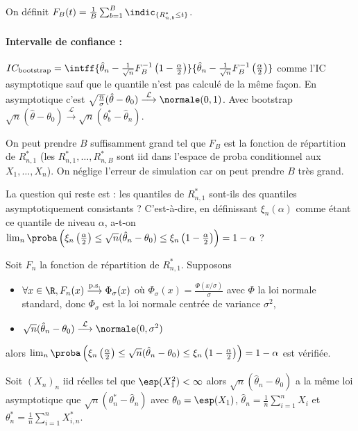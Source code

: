 	On définit $F_B(t) = \frac{1}{B} \sum_{b = 1}^B \indic_{ \{ R_{n,b}^* \leq t \} }$.
	
	\paragraph{Intervalle de confiance :}
		$IC_{\text{bootstrap}} = \intff{ \hat{\theta}_n - \frac{1}{\sqrt{n}} F_B^{-1} \left( 1 - \frac{\alpha}{2} \right) }{ \hat{\theta}_n - \frac{1}{\sqrt{n}} F_B^{-1} \left( \frac{\alpha}{2} \right)}$
		comme l'IC asymptotique sauf que le quantile n'est pas calculé de la même façon.
		En asymptotique c'est $\sqrt{\frac{n}{\sigma}} (\hat{\theta} - \theta_0) \overset{\mathcal{L}}{\longrightarrow} \normale(0,1)$.
		Avec bootstrap $\sqrt{n}(\hat{\theta} - \theta_0) \overset{\mathcal{L}}{\longrightarrow} \sqrt{n}(\theta_b^* - \hat{\theta}_n)$.

		On peut prendre $B$ suffisamment grand tel que $F_B$ est la fonction de répartition de $R_{n,1}^*$ (les $R_{n,1}^*,\ldots,R_{n,B}^*$ sont iid dans l'espace de proba conditionnel aux $X_1,\ldots,X_n$).
		On néglige l'erreur de simulation car on peut prendre $B$ très grand.
		
		La question qui reste est : les quantiles de $R_{n,1}^*$ sont-ils des quantiles asymptotiquement consistants ?
		C'est-à-dire, en définissant $\xi_n(\alpha)$ comme étant ce quantile de niveau $\alpha$, a-t-on $\lim_n \proba \left( \xi_n \left( \frac{\alpha}{2} \right) \leq \sqrt{n} (\hat{\theta}_n - \theta_0) \leq \xi_n \left( 1 - \frac{\alpha}{2} \right) \right) = 1 - \alpha$ ?

	\begin{lem}
		Soit $F_n$ la fonction de répartition de $R_{n,1}^*$.
		Supposons
		\begin{itemize}
			\item[\textbullet] $\forall x \in \R, F_n(x) \overset{\text{p.s.}}{\longrightarrow} \Phi_\sigma(x)$ où $\Phi_\sigma(x) = \frac{\Phi(x/\sigma)}{\sigma}$ avec $\Phi$ la loi normale standard, donc $\Phi_\sigma$ est la loi normale centrée de variance $\sigma^2$,
			\item[\textbullet] $\sqrt{n}(\hat{\theta}_n - \theta_0) \overset{\mathcal{L}}{\longrightarrow} \normale(0,\sigma^2)$
		\end{itemize}
		alors $\lim_n \proba \left( \xi_n \left( \frac{\alpha}{2} \right) \leq \sqrt{n} (\hat{\theta}_n - \theta_0) \leq \xi_n \left( 1 - \frac{\alpha}{2} \right) \right) = 1 - \alpha$ est vérifiée.
	\end{lem}

	\begin{thm}
		Soit $(X_n)_n$ iid réelles tel que $\esp(X_1^2) < \infty$ alors $\sqrt{n}(\hat{\theta}_n - \theta_0)$ a la même loi asymptotique que $\sqrt{n}(\theta_n^* - \hat{\theta}_n)$ avec $\theta_0 = \esp(X_1)$, $\hat{\theta}_n = \frac{1}{n} \sum_{i = 1}^n X_i$ et $\theta_n^* = \frac{1}{n} \sum_{i = 1}^n X_{i,n}^*$.
	\end{thm}
